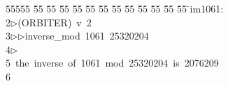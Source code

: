 %
%
\begin{tabbing}
55555 \= 55 \= 55 \= 55 \= 55 \= 55 \= 55 \= 55 \= 55 \= 55 \= 55 \= 55 \= 55 \= \>im1061:\\[0pt]
2\>$\triangleright$\>(ORBITER)\ v\ 2\ \\[0pt]
3\>$\triangleright$\>$\triangleright$\>inverse\_mod\ 1061\ 25320204\\[0pt]
4\>$\triangleright$\>\\[0pt]
5\>\ the\ inverse\ of\ 1061\ mod\ 25320204\ is\ 2076209\\[0pt]
6\>\end{tabbing}
